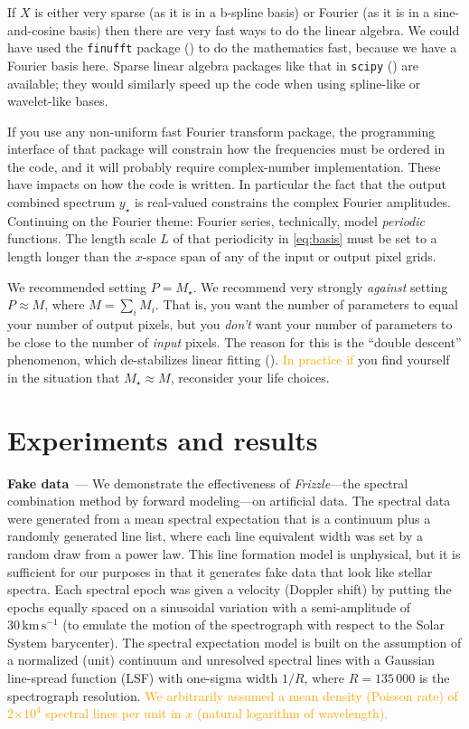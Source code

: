 \documentclass[modern, linenumbers]{aastex631}
\renewcommand{\paragraph}[1]{\medskip\par\noindent\textbf{#1}~---}
\newcommand{\name}{\textsl{Frizzle}}
\newcommand{\unit}[1]{\mathrm{#1}}
\newcommand{\kmps}{\unit{km\,s^{-1}}}
\newcommand{\modified}[1]{\textcolor{orange}{#1}}
\begin{document}
If $X$ is either very sparse (as it is in a b-spline basis) or Fourier (as it is in a sine-and-cosine basis) then there are very fast ways to do the linear algebra.
We could have used the \texttt{finufft} package (\citealt{finufft}) to do the mathematics fast, because we have a Fourier basis here.
Sparse linear algebra packages like that in \texttt{scipy} (\citealt{scipy}) are available; they would similarly speed up the code when using spline-like or wavelet-like bases.

If you use any non-uniform fast Fourier transform package, the programming interface of that package will constrain how the frequencies must be ordered in the code, and it will probably require complex-number implementation.
These have impacts on how the code is written.
In particular the fact that the output combined spectrum $y_\star$ is real-valued constrains the complex Fourier amplitudes.
Continuing on the Fourier theme:
Fourier series, technically, model \emph{periodic} functions.
The length scale $L$ of that periodicity in \eqref{eq:basis} must be set to a length longer than the $x$-space span of any of the input or output pixel grids.

We recommended setting $P=M_\star$.
We recommend very strongly \emph{against} setting $P\approx M$, where $M=\sum_i M_i$.
That is, you want the number of parameters to equal your number of output pixels, but you \emph{don't} want your number of parameters to be close to the number of \emph{input} pixels.
The reason for this is the ``double descent'' phenomenon, which de-stabilizes linear fitting (\citealt{doubledescent}).
\modified{In practice if}
you find yourself in the situation that $M_\star\approx M$, reconsider your life choices.

\section{Experiments and results}\label{sec:results}

\paragraph{Fake data}
We demonstrate the effectiveness of \name{}---the spectral combination method by forward modeling---on artificial data.
The spectral data were generated from a mean spectral expectation that is a continuum plus a randomly generated line list, where each line equivalent width was set by a random draw from a power law. 
This line formation model is unphysical, but it is sufficient for our purposes in that it generates fake data that look like stellar spectra.
Each spectral epoch was given a velocity (Doppler shift) by putting the epochs equally spaced on a sinusoidal variation with a semi-amplitude of $30\,\kmps$ (to emulate the motion of the spectrograph with respect to the Solar System barycenter).
The spectral expectation model is built on the assumption of a normalized (unit) continuum and unresolved spectral lines with a Gaussian line-spread function (LSF) with one-sigma width $1/R$, where $R=135\,000$ is the spectrograph resolution. \modified{We arbitrarily assumed a mean density (Poisson rate) of 2$\times{}10^4$ spectral lines per unit in $x$ (natural logarithm of wavelength).}
\end{document}
